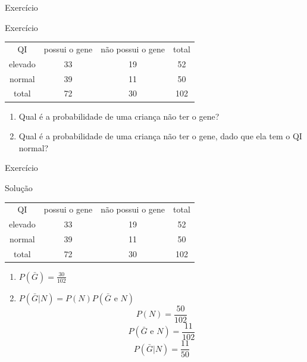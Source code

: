 \documentclass{beamer}
\begin{document}

\begin{frame}{Exercício}
  \begin{block}{Exercício}
    \begin{tabular}{ccc|c}
      QI & possui o gene & não possui o gene & total\\
      elevado & 33 & 19 & 52\\
      normal & 39 & 11 & 50\\
      \hline
      total & 72 & 30 & 102\\
    \end{tabular}
    \begin{enumerate}
    \item Qual é a probabilidade de uma criança não ter o gene?
    \item Qual é a probabilidade de uma criança não ter o gene, dado
      que ela tem o QI normal?
    \end{enumerate}
  \end{block}
\end{frame}

\begin{frame}{Exercício}
  \begin{block}{Solução}
  \begin{tabular}{ccc|c}
    QI & possui o gene & não possui o gene & total\\
    elevado & 33 & 19 & 52\\
    normal & 39 & 11 & 50\\
    \hline
    total & 72 & 30 & 102\\
  \end{tabular}
    \begin{enumerate}
    \item $P(\bar{G}) = \frac{30}{102}$
    \item $P(\bar{G}|N) = P(N)P(\bar{G} \text{ e } N)$
      \begin{displaymath}
        P(N) = \frac{50}{102}
      \end{displaymath}
      \begin{displaymath}
        P(\bar{G} \text{ e } N) = \frac{11}{102}
      \end{displaymath}
      \begin{displaymath}
        P(\bar{G}|N) = \frac{11}{50}
      \end{displaymath}
    \end{enumerate}
  \end{block}
\end{frame}
\end{document}
